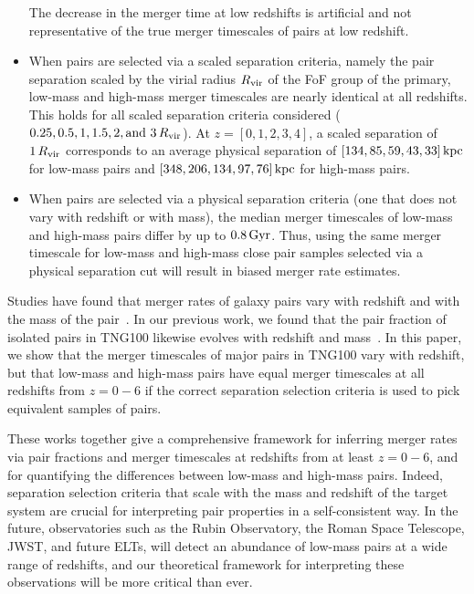 \documentclass[twocolumn,linenumbers]{aastex631}
\begin{document}
\begin{itemize}
        The decrease in the merger time at low redshifts is artificial and not representative of the true merger timescales of pairs at low redshift.
        \item When pairs are selected via a scaled separation criteria, namely the pair separation scaled by the virial radius $R_{\mathrm{vir}}$ of the FoF group of the primary, low-mass and high-mass merger timescales are nearly identical at all redshifts. This holds for all scaled separation criteria considered ($0.25,0.5,1,1.5,2,\mbox{and }3\,R_{\mathrm{vir}}$). At $z=[0, 1, 2, 3, 4]$, a scaled separation of $1\,R_{\mathrm{vir}}$ corresponds to an average physical separation of $[134, 85, 59, 43, 33]\mathrm{\,kpc}$ for low-mass pairs and $[348, 206, 134, 97, 76] \mathrm{\,kpc}$ for high-mass pairs.
        \item When pairs are selected via a physical separation criteria (one that does not vary with redshift or with mass), the median merger timescales of low-mass and high-mass pairs differ by up to $0.8\mathrm{\,Gyr}$. Thus, using the same merger timescale for low-mass and high-mass close pair samples selected via a physical separation cut will result in biased merger rate estimates.
    \end{itemize}

    Studies have found that merger rates of galaxy pairs vary with redshift and with the mass of the pair~\citep{Stewart2009,Hopkins2010a,RG2015}.
    In our previous work, we found that the pair fraction of isolated pairs in TNG100 likewise evolves with redshift and mass~\citep{Chamberlain2024}. 
    In this paper, we show that the merger timescales of major pairs in TNG100 vary with redshift, but that low-mass and high-mass pairs have equal merger timescales at all redshifts from $z=0-6$ if the correct separation selection criteria is used to pick equivalent samples of pairs.
    
    These works together give a comprehensive framework for inferring merger rates via pair fractions and merger timescales at redshifts from at least $z=0-6$, and for quantifying the differences between low-mass and high-mass pairs.
    Indeed, separation selection criteria that scale with the mass and redshift of the target system are crucial for interpreting pair properties in a self-consistent way. 
    In the future, observatories such as the Rubin Observatory, the Roman Space Telescope, JWST, and future ELTs, will detect an abundance of low-mass pairs at a wide range of redshifts, and our theoretical framework for interpreting these observations will be more critical than ever. 


{}

\end{document}

